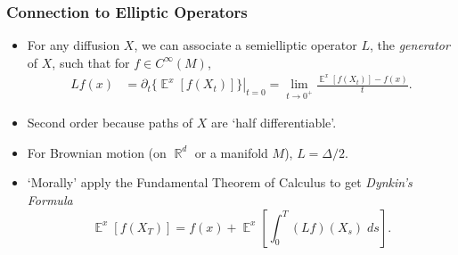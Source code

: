 \documentclass[usenames,dvipsnames,12pt]{beamer}
\DeclareMathOperator{\RR}{\mathbb{R}}
\DeclareMathOperator{\EE}{\mathbb{E}}
\begin{document}
\begin{frame}
    \frametitle{Connection to Elliptic Operators}

    \begin{itemize}
        \item For any diffusion $X$, we can associate a semielliptic operator $L$, the \emph{generator} of $X$, such that for $f \in C^\infty(M)$,
        \begin{align*}
            Lf(x) &= \left. \partial_t \{ \EE^x[f(X_t)] \} \right|_{t = 0} = \lim_{t \to 0^+} \frac{\EE^x[f(X_t)] - f(x)}{t}.
        \end{align*}

        \pause
        \item Second order because paths of $X$ are `half differentiable'.

        \pause
        \item For Brownian motion (on $\RR^d$ or a manifold $M$), $L = \Delta / 2$.

        \pause
        \item `Morally' apply the Fundamental Theorem of Calculus to get \emph{Dynkin's Formula}
        \[ \EE^x[f(X_T)] = f(x) + \EE^x \left[ \int_0^T (Lf)(X_s)\; ds \right]. \]
    \end{itemize}
\end{frame}
\end{document}
